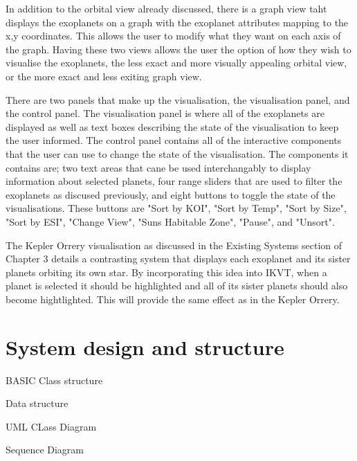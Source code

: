 In addition to the orbital view already discussed, there is a graph view taht displays the exoplanets on a graph with the exoplanet attributes mapping to the x,y coordinates. This allows the user to modify what they want on each axis of the graph. Having these two views allows the user the option of how they wish to visualise the exoplanets, the less exact and more visually appealing orbital view, or the more exact and less exiting graph view.

There are two panels that make up the visualisation, the visualisation panel, and the control panel. The visualisation panel is where all of the exoplanets are displayed as well as text boxes describing the state of the visualisation to keep the user informed. The control panel contains all of the interactive components that the user can use to change the state of the visualisation. The components it contains are; two text areas that cane be used interchangably to display information about selected planets, four range sliders that are used to filter the exoplanets as discused previously, and eight buttons to toggle the state of the visualisations. These buttons are "Sort by KOI", "Sort by Temp", "Sort by Size", "Sort by ESI", "Change View", "Suns Habitable Zone", "Pause", and "Unsort". ~


The Kepler Orrery visualisation as discussed in the Existing Systems section of Chapter 3 details a contrasting system that displays each exoplanet and its sister planets orbiting its own star. By incorporating this idea into IKVT, when a planet is selected it should be highlighted and all of its sister planets should also become hightlighted. This will provide the same effect as in the Kepler Orrery.  





\section{System design and structure}
BASIC Class structure

Data structure

UML CLass Diagram

Sequence Diagram

